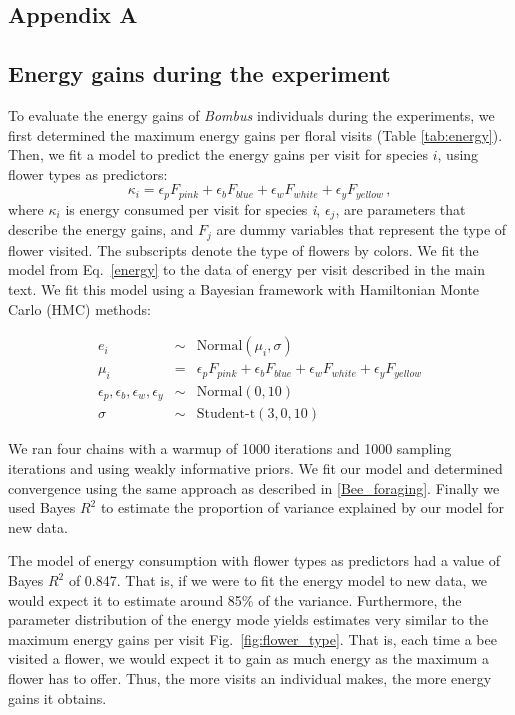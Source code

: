 \begin{refsection}
\chapter{Appendix A} %
\label{appendix_A}

\section*{Energy gains during the experiment}

To evaluate the energy gains of \textit{Bombus} individuals during the experiments, we first determined the maximum energy gains per floral visits (Table \ref{tab:energy}). Then, we fit a model to predict the energy gains per visit for species $i$, using flower types as predictors:
\begin{equation}
	\kappa_{i} = \epsilon_{p}F_{pink}+\epsilon_{b}F_{blue} + \epsilon_{w}F_{white} + \epsilon_{y} F_{yellow} \,,
	\label{energy}
\end{equation}
where $\kappa_{i}$ is energy consumed per visit for species \textit{i}, $\epsilon_j$, are parameters that describe the energy gains, and $F_j$ are dummy variables that represent the type of flower visited. The subscripts denote the type of flowers by colors. We fit the model from Eq.~\ref{energy} to the data of energy per visit described in the main text. We fit this model using a Bayesian framework with Hamiltonian Monte Carlo (HMC) methods:

\begin{eqnarray}
  e_{i} &\sim& {\textrm {Normal}}(\mu_{i}, \sigma) \\
 \mu_{i} &=& \epsilon_{p}F_{pink} +\epsilon_{b}F_{blue} + \epsilon_{w}F_{white} + \epsilon_{y} F_{yellow} \\
{\epsilon_{p},\epsilon_{b}, \epsilon_{w}, \epsilon_{y}} &\sim& {\textrm {Normal}}(0,10) \\
\sigma &\sim& {\textrm {Student-t}} (3,0,10)
 \end{eqnarray}

 We ran four chains with a warmup of 1000 iterations and 1000 sampling iterations and using weakly informative priors. We fit our model and determined convergence using the same approach as described in \autoref{Bee_foraging}. Finally we used Bayes $R^{2}$ to estimate the proportion of variance explained by our model for new data.

 The model of energy consumption with flower types as predictors had a value of Bayes $R^{2}$ of 0.847. That is, if we were to fit the energy model to new data, we would expect it to estimate around 85\% of the variance. Furthermore, the parameter distribution of the energy mode yields estimates very similar to the maximum energy gains per visit Fig.~\ref{fig:flower_type}. That is, each time a bee visited a flower, we would expect it to gain as much energy as the maximum a flower has to offer. Thus, the more visits an individual makes, the more energy gains it obtains.


\end{refsection}
